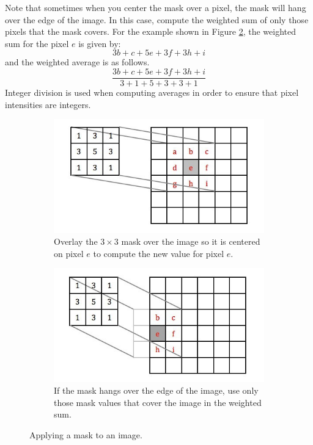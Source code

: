 \documentclass[addpoints]{exam}
\begin{document}
  Note that sometimes when you center the mask over a pixel, the mask will hang over the edge of the image. In this case, compute the weighted sum of only those pixels that the mask covers. For the example shown in Figure \ref{fig:mask-hang}, the weighted sum for the pixel $e$ is given by:
  \[
    3b + c + 5e + 3f + 3h + i
  \]
  and the weighted average is as follows.
  \[
    \frac{3b + c + 5e + 3f + 3h + i}{3+1+5+3+3+1}
  \]
  Integer division is used when computing averages in order to ensure that pixel intensities are integers.

  \begin{figure}
    \centering
    \begin{subfigure}{.48\textwidth}
      \includegraphics[width=\textwidth]{mask1}
      \caption{Overlay the $3 \times 3$ mask over the image so it is centered on pixel $e$ to compute the new value for pixel $e$.}\label{fig:mask-full}
    \end{subfigure}
    \begin{subfigure}[c]{.48\textwidth}
      \includegraphics[width=\textwidth]{mask2}
      \caption{If the mask hangs over the edge of the image, use only those mask values that cover the image in the weighted sum.}\label{fig:mask-hang}
    \end{subfigure}
    \caption{Applying a mask to an image.}
    \label{fig:mask}
  \end{figure}
\end{document}
